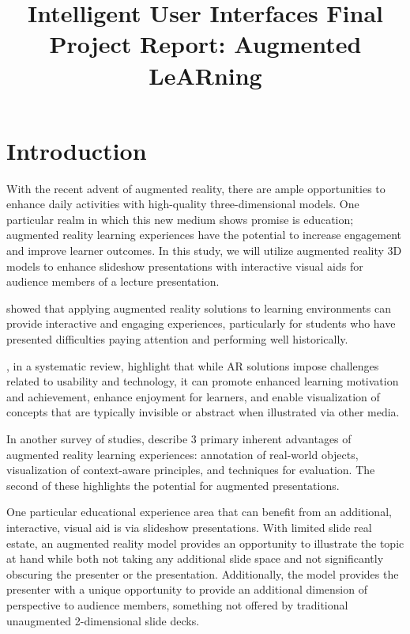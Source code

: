 \documentclass[10pt,journal]{IEEEtran}
\begin{document}
\title{Intelligent User Interfaces Final Project Report: Augmented LeARning}

\author{}

\maketitle

\section{Introduction}

With the recent advent of augmented reality, there are ample opportunities to
enhance daily activities with high-quality three-dimensional models. One
particular realm in which this new medium shows promise is education; augmented
reality learning experiences have the potential to increase engagement and
improve learner outcomes. In this study, we will utilize augmented reality 3D
models to enhance slideshow presentations with interactive visual aids for
audience members of a lecture presentation.

\citet*{dunleavy2009} showed that applying augmented reality solutions to learning
environments can provide interactive and engaging experiences, particularly for
students who have presented difficulties paying attention and performing well
historically.

\citet*{akcayir2017}, in a systematic review, highlight that while AR solutions impose
challenges related to usability and technology, it can promote enhanced
learning motivation and achievement, enhance enjoyment for learners, and enable
visualization of concepts that are typically invisible or abstract when
illustrated via other media.

In another survey of studies, \citet*{santos2014} describe 3 primary inherent
advantages of augmented reality learning experiences: annotation of real-world
objects, visualization of context-aware principles, and techniques for
evaluation. The second of these highlights the potential for augmented
presentations.

One particular educational experience area that can benefit from an additional,
interactive, visual aid is via slideshow presentations.  With limited slide
real estate, an augmented reality model provides an opportunity to illustrate
the topic at hand while both not taking any additional slide space and not
significantly obscuring the presenter or the presentation. Additionally, the
model provides the presenter with a unique opportunity to provide an additional
dimension of perspective to audience members, something not offered by
traditional unaugmented 2-dimensional slide decks.
\end{document}
